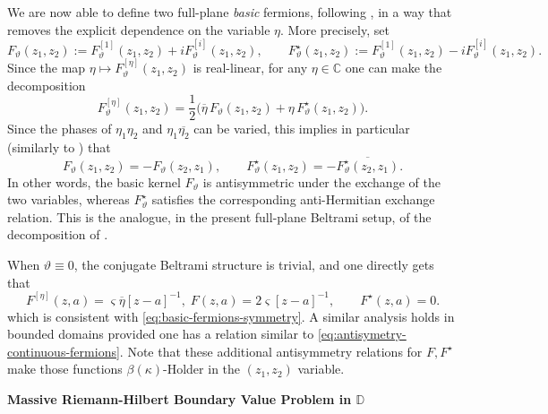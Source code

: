 \documentclass[reqno]{amsart}
\numberwithin{equation}{section}
\theoremstyle{definition}
\theoremstyle{remark}
\begin{document}
We are now able to define two full-plane \emph{basic} fermions, following \cite[Lemma~3.17]{CHI-mixed}, in a way that removes the explicit dependence on the variable
$\eta$. More precisely, set
\begin{equation}
    F_{\vartheta}(z_1, z_2)
    := F^{[1]}_{\vartheta}(z_1, z_2) + i F^{[i]}_{\vartheta}(z_1, z_2),
    \qquad
    F^{\star}_{\vartheta}(z_1, z_2)
    := F^{[1]}_{\vartheta}(z_1, z_2) - i F^{[i]}_{\vartheta}(z_1, z_2).
    \label{eq:basic-fermions-definition}
\end{equation}
Since the map $\eta \mapsto F^{[\eta]}_{\vartheta}(z_1,z_2)$ is real-linear, for any $\eta \in \mathbb{C}$ one can make the decomposition 
\begin{equation}
    F^{[\eta]}_{\vartheta}(z_1, z_2)
    =
    \frac{1}{2}\big(
        \overline{\eta}\, F_{\vartheta}(z_1, z_2)
        +
        \eta\, F^{\star}_{\vartheta}(z_1, z_2)
    \big).
    \label{eq:basic-fermions-decomposition}
\end{equation}
Since the phases of $\eta_1\eta_2$ and $\eta_1\overline{\eta_2}$ can be varied, this implies in particular (similarly to \cite[Equation below (3.14)]{CHI-mixed}) that
\begin{equation} \label{eq:basic-fermions-symmetry}
    F_{\vartheta}(z_1,z_2)=-F_{\vartheta}(z_2,z_1),
    \qquad F^{\star}_{\vartheta}(z_1,z_2) =-
    \overline{F^{\star}_{\vartheta}(z_2,z_1)}.
\end{equation}
In other words, the basic kernel $F_{\vartheta}$ is antisymmetric under the
exchange of the two variables, whereas $F^{\star}_{\vartheta}$ satisfies the
corresponding anti-Hermitian exchange relation. This is the analogue, in the
present full-plane Beltrami setup, of the decomposition of
\cite[Lemma~3.17]{CHI-mixed}.

When $\vartheta \equiv 0$, the conjugate Beltrami structure is trivial, and one directly gets that
\begin{equation}
    F^{[\eta]}(z,a)
    =
   \varsigma \overline{\eta} [z-a]^{-1}, \;    F(z,a)=2\varsigma [z-a]^{-1},
    \qquad
    F^{\star}(z,a)=0.
\end{equation}
which is consistent with \eqref{eq:basic-fermions-symmetry}.
A similar analysis holds in bounded domains provided one has a relation similar to \eqref{eq:antisymetry-continuous-fermions}. Note that these additional antisymmetry relations for $F,F^\star$ make those functions $\beta(\kappa)$-Holder in the $(z_1,z_2)$ variable. 


\textbf{Massive Riemann-Hilbert Boundary Value Problem in $\mathbb{D}$}
\end{document}
